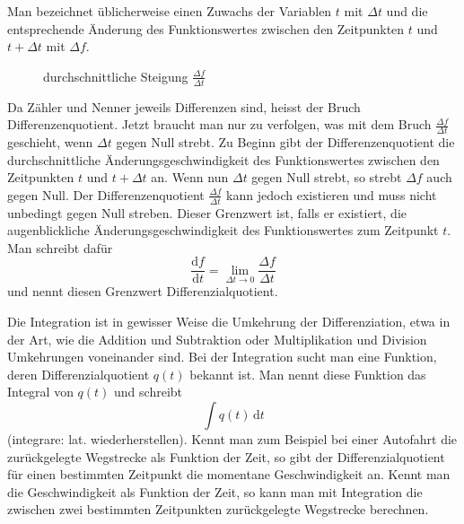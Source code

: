 \documentclass[%
<<<<<<< Updated upstream
11pt,%
twoside,%
titlepage,%
german,%
=======
11pt,%
twoside,%
titlepage,%
swissgerman,%
>>>>>>> Stashed changes
headsepline%
]{scrartcl}
\newcommand{\definition}[1]{\colorbox{emerald}{#1}}
\theoremstyle{definition}
\theoremstyle{plain}
\begin{document}
Man bezeichnet üblicherweise einen Zuwachs der Variablen $t$ mit $\Delta t$ und die entsprechende Änderung des Funktionswertes zwischen den Zeitpunkten $t$ und $t+\Delta t$ mit $\Delta f$.
\begin{figure}
\centering
{}
\caption{durchschnittliche Steigung $\frac{\Delta f}{\Delta t}$}
\end{figure}
Da Zähler und Nenner jeweils Differenzen sind, heisst der Bruch \definition{Differenzenquotient}. Jetzt braucht man nur zu verfolgen, was mit dem Bruch $\frac{\Delta f}{\Delta t}$ geschieht, wenn $\Delta t$ gegen Null strebt. Zu Beginn gibt der Differenzenquotient die durchschnittliche Ände\-rungs\-ge\-schwindig\-keit des Funktionswertes zwischen den Zeitpunkten $t$ und $t+\Delta t$ an. Wenn nun $\Delta t$ gegen Null strebt, so strebt $\Delta f$ auch gegen Null. Der  Differenzenquotient $\frac{\Delta f}{\Delta t}$ kann jedoch existieren und muss nicht unbedingt gegen Null streben. Dieser Grenzwert ist, falls er existiert, die augenblickliche Änderungsgeschwindigkeit des Funktionswertes zum Zeitpunkt $t$.
Man schreibt dafür
$$\frac{\mathrm{d}f}{\mathrm{d}t}=\lim_{\Delta t\to0}\frac{\Delta f}{\Delta t}$$
und nennt diesen Grenzwert \definition{Differenzialquotient}.

Die \definition{Integration} ist in gewisser Weise die Umkehrung der Differenziation, etwa in der Art, wie die Addition und Subtraktion oder Multiplikation und Division Umkehrungen voneinander sind. Bei der Integration sucht man eine Funktion, deren Differenzialquotient $q(t)$ bekannt ist. Man nennt diese Funktion das Integral von $q(t)$ und
schreibt
$$\int q(t)\,\mathrm{d}t$$
(integrare: lat. wiederherstellen).
Kennt man zum Beispiel bei einer Autofahrt die zu\-rück\-ge\-legte Wegstrecke als Funktion der Zeit, so gibt der Differenzialquotient für einen bestimmten Zeitpunkt die momentane Geschwindigkeit an. Kennt man die Geschwindigkeit als Funktion der Zeit, so kann man mit Integration die zwischen zwei bestimmten Zeitpunkten zurückgelegte Wegstrecke berechnen.
\end{document}
